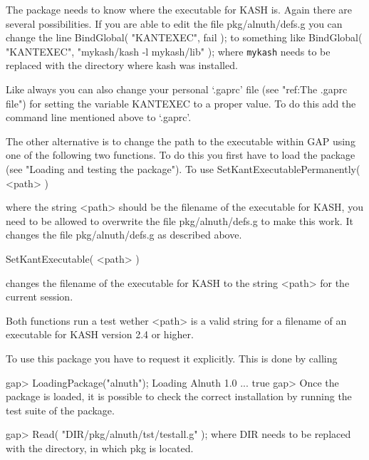 
The package needs to know where the executable for KASH is. Again there are
several possibilities. If you are able to edit the file pkg/alnuth/defs.g
you can change the line
\beginexample
    BindGlobal( "KANTEXEC", fail );
\endexample
to something like
\beginexample
    BindGlobal( "KANTEXEC", "mykash/kash -l mykash/lib" );
\endexample 
    where {\tt mykash} needs to be replaced with the directory where kash
    was installed.

Like always you can also change your personal `.gaprc' file (see "ref:The
.gaprc file") for setting the variable KANTEXEC to a proper value. To do this
add the command line mentioned above to `.gaprc'.
 
The other alternative is to change the path to the executable within GAP using
one of the following two functions. To do this you first have to load the
package (see "Loading and testing the package"). To use
\> SetKantExecutablePermanently( <path> )

where the string <path> should be the filename of the executable for KASH, you
need to be allowed to overwrite the file pkg/alnuth/defs.g to make this
work. It changes the file pkg/alnuth/defs.g as described above.

\> SetKantExecutable( <path> )

changes the filename of the executable for KASH to the string <path>
for the current session.

Both functions run a test wether <path> is a valid
string for a filename of an executable for KASH version 2.4 or
higher.


To use this package you have to request it explicitly. This is done by calling

\beginexample
    gap> LoadingPackage("alnuth");
    Loading Alnuth 1.0 ...
    true
    gap>
\endexample
Once the package is loaded, it is possible to check the correct
    installation by running the test suite of the package. 

\beginexample
    gap> Read( "DIR/pkg/alnuth/tst/testall.g" );
\endexample
    where DIR needs to be replaced with the directory, in which pkg is located.







